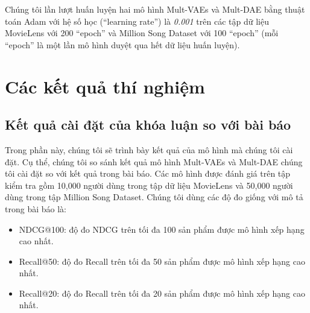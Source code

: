 Chúng tôi lần lượt huấn luyện hai mô hình Mult-VAEs và Mult-DAE bằng thuật toán Adam \cite{Goodfellow-et-al-2016-Book} với hệ số học (``learning rate'') là \textit{0.001} trên các tập dữ liệu MovieLens \cite{Ml20M} với 200 ``epoch'' và Million Song Dataset \cite{MSD} với 100 ``epoch'' (mỗi ``epoch'' là một lần mô hình duyệt qua hết dữ liệu huấn luyện).







\section{Các kết quả thí nghiệm}
    \subsection{Kết quả cài đặt của khóa luận so với bài báo}
    \label{experiment1}
    Trong phần này, chúng tôi sẽ trình bày kết quả của mô hình mà chúng tôi cài đặt. 
    Cụ thể, chúng tôi so sánh kết quả mô hình Mult-VAEs và Mult-DAE chúng tôi cài đặt so với kết quả trong bài báo.
    Các mô hình được đánh giá trên tập kiểm tra gồm 10,000 người dùng trong tập dữ liệu MovieLens và 50,000 người dùng trong tập Million Song Dataset.
    Chúng tôi dùng các độ đo giống với mô tả trong bài báo là:
    \begin{itemize}
        \item NDCG@100: độ đo NDCG trên tối đa 100 sản phẩm được mô hình xếp hạng cao nhất.
        \item Recall@50: độ đo Recall trên tối đa 50 sản phẩm được mô hình xếp hạng cao nhất.
        \item Recall@20: độ đo Recall trên tối đa 20 sản phẩm được mô hình xếp hạng cao nhất.
    \end{itemize}

